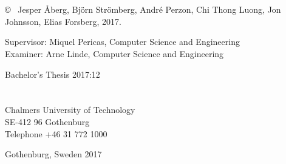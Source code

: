 \newpage
\thispagestyle{plain}
\vspace*{4.5cm}
\varHeadline \\
\varSubtitle \\
\varNames \setlength{\parskip}{1cm}

\copyright ~ Jesper Åberg, Björn Strömberg, André Perzon, Chi Thong Luong, 
Jon Johnsson, Elias Forsberg, 2017. \setlength{\parskip}{1cm}

Supervisor: Miquel Pericas, Computer Science and Engineering\\
Examiner: Arne Linde, Computer Science and Engineering \setlength{\parskip}{1cm}

Bachelor's Thesis 2017:12\\	%
\varDepartment \\
\varResearchGroupName\\
Chalmers University of Technology\\
SE-412 96 Gothenburg\\
Telephone +46 31 772 1000 \setlength{\parskip}{0.5cm}

\vfill
Gothenburg, Sweden 2017

\setlength{\parindent}{1cm}                         
